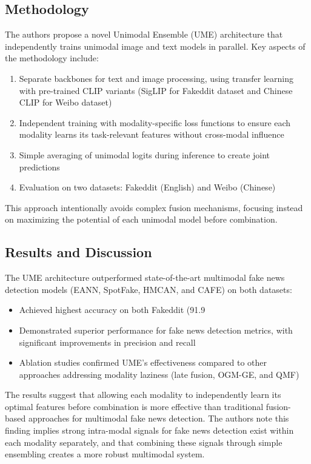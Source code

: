 \documentclass[12pt,letterpaper]{report}
\begin{document}
\subsection{Methodology}
The authors propose a novel Unimodal Ensemble (UME) architecture that independently trains unimodal image and text models in parallel. Key aspects of the methodology include:

\begin{enumerate}
    \item Separate backbones for text and image processing, using transfer learning with pre-trained CLIP variants (SigLIP for Fakeddit dataset and Chinese CLIP for Weibo dataset)
    \item Independent training with modality-specific loss functions to ensure each modality learns its task-relevant features without cross-modal influence
    \item Simple averaging of unimodal logits during inference to create joint predictions
    \item Evaluation on two datasets: Fakeddit (English) and Weibo (Chinese)
\end{enumerate}

This approach intentionally avoids complex fusion mechanisms, focusing instead on maximizing the potential of each unimodal model before combination.


\subsection{Results and Discussion}
The UME architecture outperformed state-of-the-art multimodal fake news detection models (EANN, SpotFake, HMCAN, and CAFE) on both datasets:

\begin{itemize}
    \item Achieved highest accuracy on both Fakeddit (91.9%
    \item Demonstrated superior performance for fake news detection metrics, with significant improvements in precision and recall
    \item Ablation studies confirmed UME's effectiveness compared to other approaches addressing modality laziness (late fusion, OGM-GE, and QMF)
\end{itemize}

The results suggest that allowing each modality to independently learn its optimal features before combination is more effective than traditional fusion-based approaches for multimodal fake news detection. The authors note this finding implies strong intra-modal signals for fake news detection exist within each modality separately, and that combining these signals through simple ensembling creates a more robust multimodal system.
\end{document}
